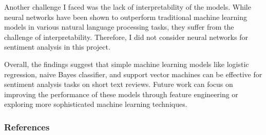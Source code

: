 \documentclass{article}
\begin{document}
Another challenge I faced was the lack of interpretability of the models. While neural networks have been shown to outperform traditional machine learning models in various natural language processing tasks, they suffer from the challenge of interpretability. Therefore, I did not consider neural networks for sentiment analysis in this project.

Overall, the findings suggest that simple machine learning models like logistic regression, naive Bayes classifier, and support vector machines can be effective for sentiment analysis tasks on short text reviews. Future work can focus on improving the performance of these models through feature engineering or exploring more sophisticated machine learning techniques.




\begin{frame}[allowframebreaks]
  \frametitle{References}
  \renewcommand{\bibfont}{\normalfont\footnotesize}
  \printbibliography
\end{frame}
\end{document}
